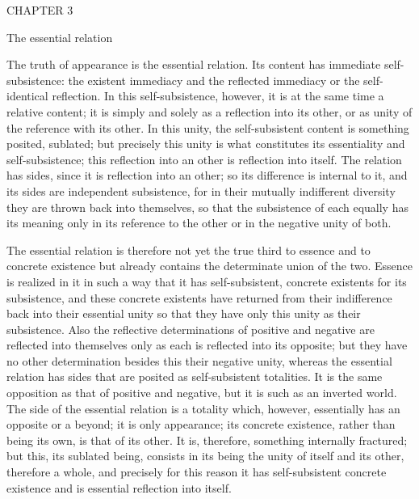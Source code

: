 CHAPTER 3

The essential relation

The truth of appearance is the essential relation.
Its content has immediate self-subsistence:
the existent immediacy and the reflected immediacy
or the self-identical reflection.
In this self-subsistence, however,
it is at the same time a relative content;
it is simply and solely as a reflection into its other,
or as unity of the reference with its other.
In this unity, the self-subsistent content is 
something posited, sublated;
but precisely this unity is what constitutes
its essentiality and self-subsistence;
this reflection into an other is reflection into itself.
The relation has sides, since it is reflection into an other;
so its difference is internal to it,
and its sides are independent subsistence,
for in their mutually indifferent diversity
they are thrown back into themselves,
so that the subsistence of each equally has its meaning
only in its reference to the other
or in the negative unity of both.

The essential relation is therefore not yet the true third
to essence and to concrete existence
but already contains the determinate union of the two.
Essence is realized in it in such a way that it has self-subsistent,
concrete existents for its subsistence,
and these concrete existents have returned
from their indifference back into their essential unity
so that they have only this unity as their subsistence.
Also the reflective determinations of positive and negative are
reflected into themselves only as each is reflected into its opposite;
but they have no other determination besides this their negative unity,
whereas the essential relation has sides
that are posited as self-subsistent totalities.
It is the same opposition as that of positive and negative,
but it is such as an inverted world.
The side of the essential relation is a totality
which, however, essentially has an opposite or a beyond;
it is only appearance;
its concrete existence,
rather than being its own,
is that of its other.
It is, therefore, something internally fractured;
but this, its sublated being, consists in
its being the unity of itself and its other,
therefore a whole, and precisely for this reason
it has self-subsistent concrete existence
and is essential reflection into itself.

